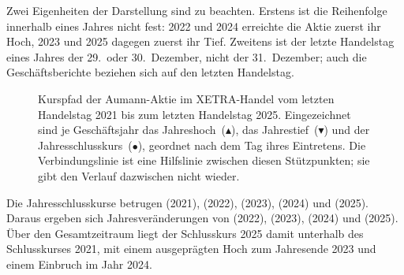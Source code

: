 Zwei Eigenheiten der Darstellung sind zu beachten. Erstens ist die
Reihenfolge innerhalb eines Jahres nicht fest: 2022 und 2024 erreichte die
Aktie zuerst ihr Hoch, 2023 und 2025 dagegen zuerst ihr Tief. Zweitens ist
der letzte Handelstag eines Jahres der 29.\ oder 30.~Dezember, nicht der
31.~Dezember; auch die Gesch\"aftsberichte beziehen sich auf den letzten
Handelstag.

\begin{figure}[htbp]
\centering
{}
\caption{Kurspfad der Aumann-Aktie im XETRA-Handel vom letzten Handelstag
2021 bis zum letzten Handelstag 2025. Eingezeichnet sind je Gesch\"aftsjahr
das Jahreshoch~(\textcolor{kurshoch}{$\blacktriangle$}), das
Jahrestief~(\textcolor{kurstief}{$\blacktriangledown$}) und der
Jahresschlusskurs~(\textcolor{kursschluss}{$\bullet$}), geordnet nach dem Tag
ihres Eintretens. Die Verbindungslinie ist eine Hilfslinie zwischen diesen
St\"utzpunkten; sie gibt den Verlauf dazwischen nicht wieder.}
\label{fig:kursverlauf}
\end{figure}

Die Jahresschlusskurse betrugen \EURje{\KursSilvesterZFI} (2021),
\EURje{\KursSilvesterZFII} (2022), \EURje{\KursSilvesterZFIII} (2023),
\EURje{\KursSilvesterZFIV} (2024) und
\EURje{\KursSilvesterZFV} (2025).
Daraus ergeben sich Jahresver\"anderungen von \Pct{\KursDeltaZFII} (2022),
\Pct{\KursDeltaZFIII} (2023), \Pct{\KursDeltaZFIV} (2024) und
\Pct{\KursDeltaZFV} (2025). \"Uber den Gesamtzeitraum liegt der Schlusskurs
2025 damit unterhalb des Schlusskurses 2021, mit einem ausgepr\"agten Hoch
zum Jahresende 2023 und einem Einbruch im Jahr 2024.

